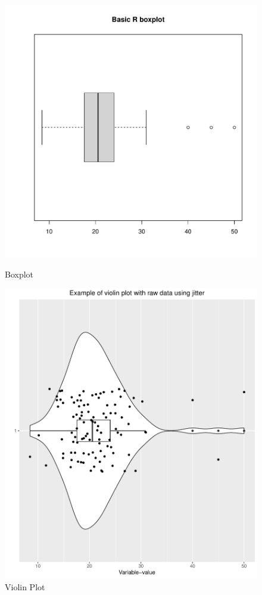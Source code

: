 \documentclass[12pt,a4paper]{article}
\begin{document}
\begin{figure}[htbp]
  \centering
  \begin{minipage}[b]{0.45\textwidth}
    \includegraphics[width=\textwidth]{./images/boxplot.pdf}
    \caption{Boxplot}
    \label{boxplot}
  \end{minipage}
  \hfill  %
  \begin{minipage}[b]{0.45\textwidth}
    \includegraphics[width=\textwidth]{./images/violin_plot.pdf}
    \caption{Violin Plot}
    \label{violinplot}
  \end{minipage}
\end{figure}
\end{document}
